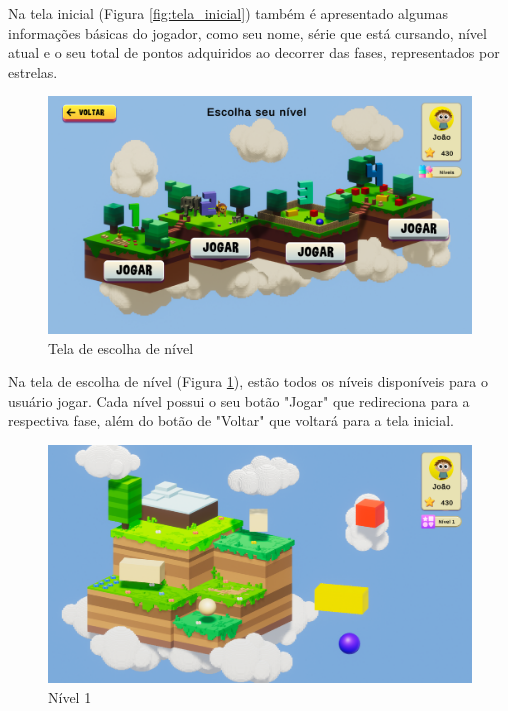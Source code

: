 \documentclass[article,12pt,openany,oneside,a4paper,english,brazil]{abntex2}
\begin{document}
Na tela inicial (Figura \ref{fig:tela_inicial}) também é apresentado algumas informações básicas do jogador, como seu nome, série que está cursando, nível atual e o seu total de pontos adquiridos ao decorrer das fases, representados por estrelas.

\begin{figure}[H]
    \centering
    \caption{Tela de escolha de nível}
    \label{fig:tela_escolha_nivel}
    \includegraphics[width=0.8\linewidth]{GameScreenshots/ChooseLevel.png}
\end{figure}

Na tela de escolha de nível (Figura \ref{fig:tela_escolha_nivel}), estão todos os níveis disponíveis para o usuário jogar. Cada nível possui o seu botão "Jogar" que redireciona para a respectiva fase, além do botão de "Voltar" que voltará para a tela inicial.

\begin{figure}[H]
    \centering
    \caption{Nível 1}
    \label{fig:nivel_1}
    \includegraphics[width=0.8\linewidth]{GameScreenshots/Level1.png}
\end{figure}
\end{document}
